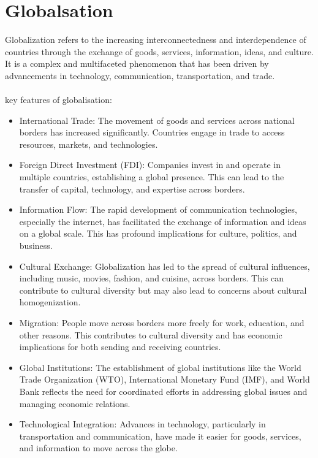 \documentclass{report}
\begin{document}
\section{Globalsation} %
\label{sec:Globalsation}
Globalization refers to the increasing interconnectedness and interdependence of countries through the exchange of goods, services, information, ideas, and culture. It is a complex and multifaceted phenomenon that has been driven by advancements in technology, communication, transportation, and trade.
\\
\\
key features of globalisation:
\\
\begin{itemize}
  \item{International Trade: The movement of goods and services across national borders has increased significantly. Countries engage in trade to access resources, markets, and technologies.}
  \item{Foreign Direct Investment (FDI): Companies invest in and operate in multiple countries, establishing a global presence. This can lead to the transfer of capital, technology, and expertise across borders.}
  \item{Information Flow: The rapid development of communication technologies, especially the internet, has facilitated the exchange of information and ideas on a global scale. This has profound implications for culture, politics, and business.}
  \item{Cultural Exchange: Globalization has led to the spread of cultural influences, including music, movies, fashion, and cuisine, across borders. This can contribute to cultural diversity but may also lead to concerns about cultural homogenization.}
  \item{Migration: People move across borders more freely for work, education, and other reasons. This contributes to cultural diversity and has economic implications for both sending and receiving countries.}
  \item{Global Institutions: The establishment of global institutions like the World Trade Organization (WTO), International Monetary Fund (IMF), and World Bank reflects the need for coordinated efforts in addressing global issues and managing economic relations.}
  \item{Technological Integration: Advances in technology, particularly in transportation and communication, have made it easier for goods, services, and information to move across the globe.}
\end{itemize}
\end{document}
